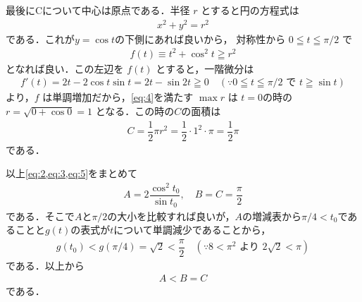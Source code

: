 \documentclass[../../main.tex]{subfiles}
\begin{document}
最後にCについて中心は原点である．半径 $r$ とすると円の方程式は
\begin{align}
  x^2 + y^2 = r^2
\end{align}
である．これが$y=\cos t$の下側にあれば良いから，
対称性から $0 \leqq t \leqq \pi/2$ で
\begin{align}
  f(t) \equiv t^2 + \cos^2 t \geqq r^2 \label{eq:4}
\end{align}
となれば良い．この左辺を $f(t)$ とすると，一階微分は
\begin{align}
  f'(t)
  = 2t - 2\cos t\sin t
  = 2t - \sin 2t \geqq 0 \quad (\because 0 \leqq t \leqq \pi/2 \text{ で } t \geqq \sin t)
\end{align}
より，$f$ は単調増加だから，\cref{eq:4}を満たす $\max r$ は $t=0$の時の$r = \sqrt{0 + \cos 0} = 1$ となる．この時の$C$の面積は
\begin{align}
  C = \dfrac{1}{2}\pi r^2 = \dfrac{1}{2} \cdot 1^2 \cdot \pi = \dfrac{1}{2}\pi \label{eq:5}
\end{align}
である．
\casesend

以上\cref{eq:2,eq:3,eq:5}をまとめて
\begin{align}
  A = 2\dfrac{\cos^2 t_0}{\sin t_0},
  \quad
  B = C = \dfrac{\pi}{2}
\end{align}
である．そこで$A$と$\pi/2$の大小を比較すれば良いが，$A$の増減表から$\pi/4 < t_0$であることと$g(t)$の表式が$t$について単調減少であることから，
\begin{align}
  g(t_0) < g(\pi/4) = \sqrt{2} < \dfrac{\pi}{2}
  \quad (\because 8 < \pi^2 \text{ より } 2\sqrt{2} < \pi)
\end{align}
である．以上から
\begin{align}
  A < B = C
\end{align}
である．
\end{document}
